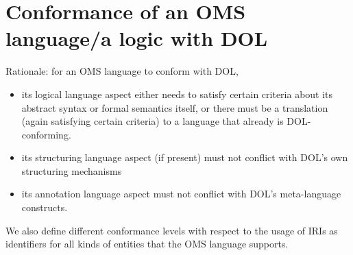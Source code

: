 \documentclass[10pt,fleqn,%
\ifpretendfinal
final%
\else
draft%
\fi,
]{scrreprt}
\makeatletter
\newcommand*\CommentAuthor{}
\renewcommand*\CommentAuthor{#1}}
\newcommand*\CommentDate{}
\renewcommand*\CommentDate{#1}}
\newcommand*\CommentId{}
\renewcommand*\CommentId{#1}}
\newcommand*\CommentType{}
\renewcommand*\CommentType{#1}}
\newcommand*{\SetCommentColorByType}[1]{%
\edef\localType{{#1}}%
\expandafter\ifstrequal\localType{q-aut}{\colorlet{CommentColor}{red}}{%
\expandafter\ifstrequal\localType{q-all}{\colorlet{CommentColor}{orange}}{%
\expandafter\ifstrequal\localType{todo}{\colorlet{CommentColor}{orange}}{%
\expandafter\ifstrequal\localType{fyi}{\colorlet{CommentColor}{lightgray}}{%
\colorlet{CommentColor}{yellow}}}}}}
\newcommand*{\SetCommentPrefixByType}[1]{%
\edef\localType{{#1}}%
\expandafter\@ifmtarg\localType{%
\edef\CommentPrefix{}%
}{%
\caseupper[q]{#1}%
\edef\CommentPrefix{\thestring: }%
}}
\newcommand*{\initComment}[1]{%
\setkeys{Comment}{#1}%
\SetCommentColorByType{\CommentType}%
\relax%
\SetCommentPrefixByType{\CommentType}%
\relax%
}
\newcommand*{\todonote}[2][]{%
\initComment{#1}%
\pdfcomment[author=\CommentAuthor,color=CommentColor,date=\CommentDate,id=\CommentId]{%
\CommentPrefix
#2}}
\renewcommand*{\todonote}[2][]{%
\initComment{#1}%
\ednote{\CommentPrefix #2}}
\newcommand{\sclause}[1]{\section{#1}}
\makeatother
\begin{document}
\sclause{Conformance of an OMS language/a logic with DOL}\label{c:conform:logic}

Rationale: for an OMS language to conform with DOL,
\begin{itemize}
\item its logical language aspect either needs to satisfy certain criteria about its abstract
syntax or formal semantics itself, or there must be a translation (again satisfying certain
criteria) to a language that already is DOL-conforming.
\item its structuring language aspect (if present) must not conflict with DOL's own structuring
mechanisms
\item its annotation language aspect must not conflict with DOL's meta-language constructs.
\end{itemize}
We also define different conformance levels with respect to the usage of IRIs as identifiers for all kinds
of entities that the OMS language supports.

%
%
\end{document}

